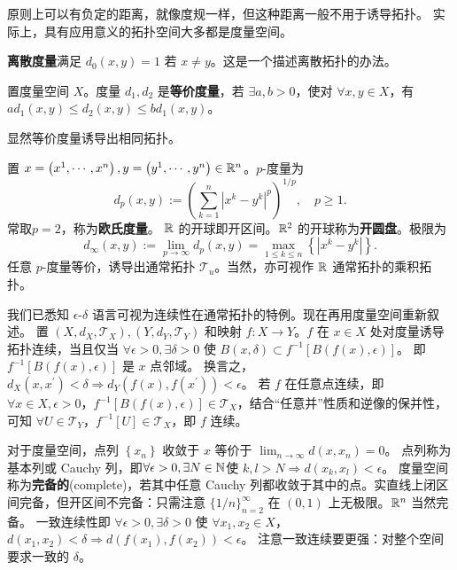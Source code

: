 \begin{remark}
    原则上可以有负定的距离，就像度规一样，但这种距离一般不用于诱导拓扑。
    实际上，具有应用意义的拓扑空间大多都是度量空间。
\end{remark}

\begin{eg}
    \textbf{离散度量}满足 $d_{0}(x,y)=1$ 若 $x \ne y$。这是一个描述离散拓扑的办法。
\end{eg}

\begin{definition}
    置度量空间 $X$。度量 $d_{1},d_{2}$ 是\textbf{等价度量}，若 $\exists a,b>0$，使对 $\forall x,y \in X$，有 $a d_{1}(x, y) \leqslant d_{2}(x, y) \leqslant b d_{1}(x, y)$。
\end{definition}

\begin{remark}
    显然等价度量诱导出相同拓扑。
\end{remark}

\begin{eg}
    置 $x=\left(x^1,\cdots,x^{n}\right),y=\left(y^{1},\cdots,y^{n}\right)\in\mathbb{R}^{n}$。$p$-度量为
\[
d_{p}(x, y):=\left(\sum_{k=1}^{n}\left|x^{k}-y^{k}\right|^{p}\right)^{1 / p},\quad p \geqslant 1.
\]
常取$p=2$，称为\textbf{欧氏度量}。
$\mathbb{R}$ 的开球即开区间。$\mathbb{R}^2$ 的开球称为\textbf{开圆盘}。极限为
\[
d_{\infty}(x,y):=\lim_{p\to\infty}d_{p}(x, y)=\max _{1 \leqslant k \leqslant n}\left\{\left|x^{k}-y^{k}\right|\right\}.
\]
任意 $p$-度量等价，诱导出通常拓扑 $\mathscr T_u$。当然，亦可视作 $\mathbb{R}$ 通常拓扑的乘积拓扑。
\end{eg}

我们已悉知 $\epsilon$-$\delta$ 语言可视为连续性在通常拓扑的特例。现在再用度量空间重新叙述。
置 $(X,d_X,\mathscr T_X),(Y,d_Y,\mathscr T_Y)$ 和映射 $f:X\to Y$。$f$ 在 $x \in X$ 处对度量诱导拓扑连续，当且仅当 $\forall\epsilon>0,\exists\delta>0$ 使 $B(x,\delta) \subset f^{-1} [B(f(x),\epsilon)]$。
即 $f^{-1} [B(f(x),\epsilon)]$ 是 $x$ 点邻域。
换言之，$d_X(x,x^{\prime})<\delta\Rightarrow d_Y(f(x),f(x^{\prime}))<\epsilon$。
若 $f$ 在任意点连续，即 $\forall x \in X,\epsilon > 0$，$f^{-1} [B(f(x),\epsilon)]\in\mathscr T_X$，结合“任意并”性质和逆像的保并性，可知 $\forall U\in\mathscr T_Y$，$f^{-1}[U]\in\mathscr T_X$，即 $f$ 连续。

对于度量空间，点列 $\left\{x_n\right\}$ 收敛于 $x$ 等价于 $\lim_{n\to\infty}d(x, x_n)=0$。
点列称为基本列或 Cauchy 列，即$\forall\epsilon>0,\exists N\in\mathbb{N}$使 $k,l>N\Rightarrow d(x_{k},x_{l})<\epsilon$。
度量空间称为\textbf{完备的}(complete)，若其中任意 Cauchy 列都收敛于其中的点。实直线上闭区间完备，但开区间不完备：只需注意 $\{1/n\}_{n=2}^\infty$ 在 $(0,1)$ 上无极限。$\mathbb{R}^{n}$ 当然完备。
一致连续性即 $\forall \epsilon>0,\exists\delta>0$ 
使 $\forall x_{1},x_{2} \in X$，$d(x_{1},x_{2})<\delta\Rightarrow d(f(x_{1}),f(x_{2}))<\epsilon$。
注意一致连续要更强：对整个空间要求一致的 $\delta$。

